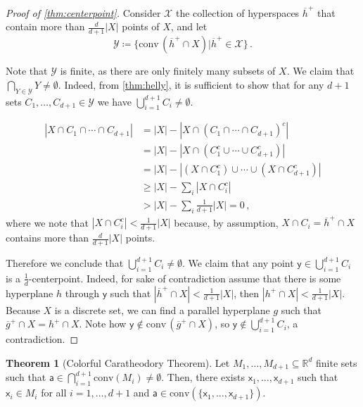 \documentclass[12pt]{amsart}
\theoremstyle{definition}
\newtheorem{thm}{Theorem}[section]
\newcommand{\R}{\mathbb{R}}
\newcommand{\vx}{\mathsf{x}}
\newcommand{\vy}{\mathsf{y}}
\newcommand{\va}{\mathsf{a}}
\newcommand{\conv}{\mathrm{conv}}
\begin{document}
\begin{proof}[Proof of \cref{thm:centerpoint}]
Consider $\mathcal X $ the collection of hyperspaces $\overline{h}^+$ that contain more than $\frac{d}{d+1}|X|$ points of $X$, and let 
$$ \mathcal Y \coloneqq \{ \conv \, (\overline{h}^+ \cap X) | \overline{h}^+ \in \mathcal X \}\, . $$

Note that $\mathcal Y $ is finite, as there are only finitely many subsets of $X$.
We claim that $\bigcap_{Y \in \mathcal Y} Y \neq \emptyset$.
Indeed, from \cref{thm:helly}, it is sufficient to show that for any $d+1$ sets $C_1, \ldots, C_{d+1} \in \mathcal Y$ we have $\bigcup_{i=1}^{d+1} C_i \neq \emptyset$.

\begin{align*}
|X \cap C_1\cap \cdots \cap C_{d+1} |  &= |X| - |X \cap (C_1 \cap \cdots \cap C_{d+1})^c | \\
&= |X| - |X \cap (C_1^c \cup \cdots \cup C_{d+1}^c) | \\
&= |X| - |(X \cap C_1^c) \cup \cdots \cup (X \cap C_{d+1}^c)|\\
&\geq |X| - \sum_i |X \cap C_i^c|\\
&> |X| - \sum_i \frac{1}{d+1} |X| = 0 \, ,
\end{align*}
where we note that $|X \cap C_i^c| < \frac{1}{d+1}|X|$ because, by assumption, $X \cap C_i = \overline{h}^+ \cap X$ contains more than $\frac{d}{d+1}|X|$ points.

Therefore we conclude that $\bigcup_{i=1}^{d+1} C_i \neq \emptyset$.
We claim that any point $\vy \in \bigcup_{i=1}^{d+1} C_i $ is a $\frac{1}{d}$-centerpoint.
Indeed, for sake of contradiction assume that there is some hyperplane $h$ through $\vy$ such that $|\overline{h}^+ \cap X|< \frac{1}{d+1}|X|$, then  $|h^+ \cap X|< \frac{1}{d+1}|X|$.
Because $X$ is a discrete set, we can find a parallel hyperplane $g$ such that $\overline{g}^+\cap X = h^+ \cap X$.
Note how  $\vy \not \in \conv \, (\overline{g}^+ \cap X)$, so $\vy \not \in \bigcup_{i=1}^{d+1} C_i $, a contradiction.
\end{proof}


\begin{thm}[Colorful Caratheodory Theorem]\label{thm:colorful_c}
Let $M_1, \ldots, M_{d+1} \subseteq \R^d$ finite sets such that $\va \in \bigcap_{i = 1}^{d+1} \conv (M_i) \neq \emptyset$.
Then, there exists $\vx_1, \dots, \vx_{d+1}$ such that $\vx_i \in M_i$ for all $i = 1, \ldots, d+1$ and $\va \in \conv (\{\vx_1, \ldots, \vx_{d+1}\})$.
\end{thm}
\end{document}
